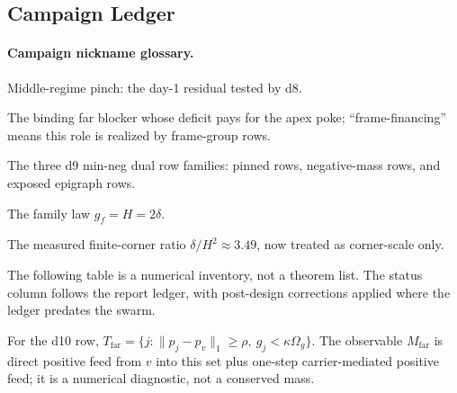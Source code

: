 \subsection{Campaign Ledger}

\paragraph{Campaign nickname glossary.}
\begin{description}[leftmargin=1.1in,style=nextline]
\item[MRP] Middle-regime pinch: the day-1 residual tested by d8.
\item[Financier] The binding far blocker whose deficit pays for the apex poke;
``frame-financing'' means this role is realized by frame-group rows.
\item[pin/neg/epi] The three d9 min-neg dual row families: pinned rows,
negative-mass rows, and exposed epigraph rows.
\item[Budget line] The family law \(g_f=H=2\delta\).
\item[Flat floor] The measured finite-corner ratio
\(\delta/H^2\approx3.49\), now treated as corner-scale only.
\end{description}

\begin{warning}
\numbadge The following table is a numerical inventory, not a theorem list.
The status column follows the report ledger, with post-design corrections
applied where the ledger predates the swarm.
\end{warning}

For the d10 row,
\(T_{\mathrm{far}}=\{j:\|p_j-p_v\|_1\ge\rho,\ g_j<\kappa\Omega_g\}\).
The observable \(M_{\mathrm{far}}\) is direct positive feed from \(v\) into
this set plus one-step carrier-mediated positive feed; it is a numerical
diagnostic, not a conserved mass.

